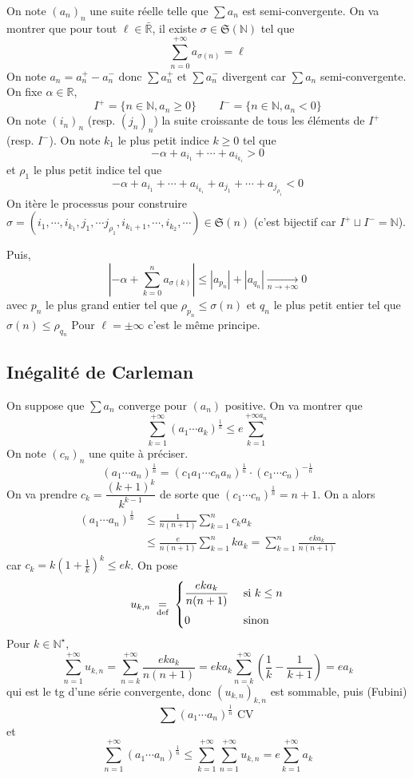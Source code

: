 
On note $(a_n)_n$ une suite réelle telle que $\sum a_n$ est semi-convergente. On va montrer que pour tout $\ell\in\bar{\mathbb R}$, il existe $\sigma\in\mathfrak S(\mathbb N)$ tel que \[
    \sum_{n=0}^{+\infty}a_{\sigma(n)}=\ell
\]
On note $a_n=a_n^+-a_n^-$ donc $\sum a_n^+$ et $\sum a_n^-$ divergent car $\sum a_n$ semi-convergente. On fixe $\alpha\in\mathbb R$, \[I^+=\{n\in\mathbb N, a_n\geq 0\}\qquad I^-=\{n\in\mathbb N, a_n<0\}\]
On note $(i_n)_n$ (resp. $(j_n)_n$) la suite croissante de tous les éléments de $I^+$ (resp. $I^-$).
On note $k_1$ le plus petit indice $k\geq 0$ tel que \[
    -\alpha+a_{i_1}+\cdots +a_{i_{k_1}}>0
\]
et $\rho_1$ le plus petit indice tel que \[
    -\alpha+a_{i_1}+\cdots +a_{i_{k_1}}+a_{j_1}+\cdots +a_{j_{\rho_1}}<0
\]
On itère le processus pour construire $\sigma=(i_1, \cdots, i_{k_1}, j_1, \cdots j_{\rho_1}, i_{k_1+1}, \cdots, i_{k_2}, \cdots)\in\mathfrak S(n)$ (c'est bijectif car $I^+\sqcup I^-=\mathbb N$).

Puis, \[
    \left| -\alpha+\sum_{k=0}^na_{\sigma(k)} \right|\leq |a_{p_n}|+|a_{q_n}|\xrightarrow[n\to+\infty]{}0
\]
avec $p_n$ le plus grand entier tel que $\rho_{p_n}\leq \sigma(n)$ et $q_n$ le plus petit entier tel que $\sigma(n)\leq \rho_{q_n}$
Pour $\ell=\pm\infty$ c'est le même principe.

\subsection{Inégalité de Carleman}


On suppose que $\sum a_n$ converge pour $(a_n)$ positive. On va montrer que \[
    \sum_{k=1}^{+\infty}(a_1\cdots a_k)^{\frac1k}\leq e\sum_{k=1}^{+\infty a_n}
\]
On note $(c_n)_n$ une quite à préciser. \[
    (a_1\cdots a_n)^{\frac1n}=(c_1a_1\cdots c_na_n)^{\frac1n}\cdot (c_1\cdots c_n)^{-\frac1n}
\]
On va prendre $c_k=\dfrac{(k+1)^k}{k^{k-1}}$ de sorte que $(c_1\cdots c_n)^{\frac1n}=n+1$. On a alors \begin{align*}
    (a_1\cdots a_n)^{\frac 1n}&\leq \frac1{n(n+1)}\sum_{k=1}^nc_ka_k \tag{AM-GM}\\
                              &\leq \frac e{n(n+1)}\sum_{k=1}^nka_k=\sum_{k=1}^n\frac{eka_k}{n(n+1)}
\end{align*}
car $c_k=k \left( 1+\frac1k \right)^k\leq ek $. On pose \[
    u_{k, n}\;\underset{\text{def}}=\; \begin{cases}
        \dfrac{eka_k}{n(n+1)}&\text{ si }k\leq n\\[1em] 0 & \text{ sinon }
    \end{cases}
\]
Pour $k\in\mathbb N^\star,$ \[
    \sum_{n=1}^{+\infty}u_{k, n}=\sum_{n=k}^{+\infty}\frac{eka_k}{n(n+1)}=eka_k\sum_{n=k}^{+\infty} \left( \frac1k-\frac1{k+1} \right)=ea_k
\]
qui est le tg d'une série convergente, donc $(u_{k, n})_{k, n}$ est sommable, puis (Fubini) \[
    \sum (a_1\cdots a_n)^{\frac1n} \text{ CV }
\]
et \[
    \sum_{n=1}^{+\infty}(a_1\cdots a_n)^{\frac1n}\leq \sum_{k=1}^{+\infty}\sum_{n=1}^{+\infty}u_{k,n}=e\sum_{k=1}^{+\infty}a_k
\]

